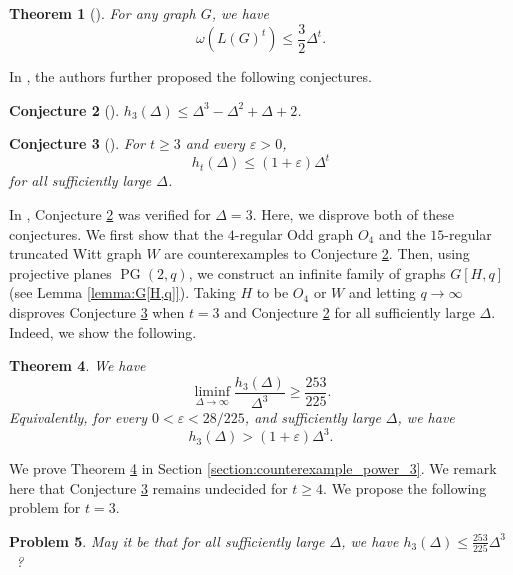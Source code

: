 \documentclass[11pt]{article}
\theoremstyle{plain}
\newtheorem{theorem}{Theorem}[section]
\newtheorem{conjecture}[theorem]{Conjecture}
\newtheorem{problem}[theorem]{Problem}
\numberwithin{equation}{section}
\DeclareMathOperator{\PG}{PG}
\begin{document}
\begin{theorem}[\cite{Cambie_Batenburg_Verclos_Kang_2022}] For any graph $G$, we have 
\[\omega(L(G)^t) \le \frac{3}{2}\Delta^t.\]
\end{theorem}

In \cite{Cambie_Batenburg_Verclos_Kang_2022}, the authors further proposed the following conjectures. 

\begin{conjecture}[\cite{Cambie_Batenburg_Verclos_Kang_2022}]\label{conj:power_3} $h_3(\Delta)\le \Delta^3-\Delta^2+\Delta+2$.
\end{conjecture}

\begin{conjecture}[\cite{Cambie_Batenburg_Verclos_Kang_2022}]\label{conj:large_max_degree} For $t\ge 3$ and every
    $\varepsilon>0$,
    \[
        h_t(\Delta)\le (1+\varepsilon)\Delta^t
    \]
    for all sufficiently large $\Delta$.
\end{conjecture}

In \cite{Cambie_Batenburg_Verclos_Kang_2022}, Conjecture \ref{conj:power_3} was verified for $\Delta = 3$. Here, we disprove both of these conjectures. We first show that the $4$-regular Odd graph $O_4$ and the $15$-regular truncated Witt graph $W$ are counterexamples to Conjecture \ref{conj:power_3}. Then, using projective planes $\PG(2,q)$, we construct an infinite family of graphs $G[H,q]$ (see Lemma \ref{lemma:G[H,q]}). Taking $H$ to be $O_4$ or $W$ and letting $q\to \infty$ disproves Conjecture \ref{conj:large_max_degree} when $t = 3$ and Conjecture \ref{conj:power_3} for all sufficiently large $\Delta$. Indeed, we show the following.

\begin{theorem}\label{thm:infinite_counter_power_3}
 We have
\[
\liminf_{\Delta\to\infty}\frac{h_3(\Delta)}{\Delta^3}\ge \frac{253}{225}.
\]
Equivalently, for every $0<\varepsilon<28/225$, and sufficiently large $\Delta$, we have 
\[
        h_3(\Delta)>(1+\varepsilon)\Delta^3.
\]
\end{theorem}

We prove Theorem \ref{thm:infinite_counter_power_3} in Section \ref{section:counterexample_power_3}. We remark here that Conjecture \ref{conj:large_max_degree} remains undecided for $t\ge 4$. We propose the following problem for $t=3$. 

\begin{problem} 
May it be that for all sufficiently large $\Delta$, we have $h_3(\Delta)\le \frac{253}{225}\Delta^3$~?
\end{problem}
\end{document}
